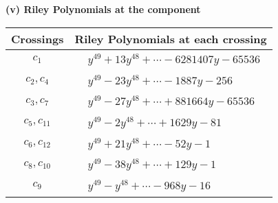 \documentclass[1p]{elsarticle_modified}
\theoremstyle{definition}
\begin{document}
\flushleft \textbf{(v) Riley Polynomials at the component}\newline \\
\begin{tabular}{m{50pt}|m{274pt}}
Crossings & \hspace{64pt}Riley Polynomials at each crossing \\
\hline $$\begin{aligned}c_{1}\end{aligned}$$&$\begin{aligned}
&y^{49}+13 y^{48}+\cdots-6281407 y-65536
\end{aligned}$\\
\hline $$\begin{aligned}c_{2},c_{4}\end{aligned}$$&$\begin{aligned}
&y^{49}-23 y^{48}+\cdots-1887 y-256
\end{aligned}$\\
\hline $$\begin{aligned}c_{3},c_{7}\end{aligned}$$&$\begin{aligned}
&y^{49}-27 y^{48}+\cdots+881664 y-65536
\end{aligned}$\\
\hline $$\begin{aligned}c_{5},c_{11}\end{aligned}$$&$\begin{aligned}
&y^{49}-2 y^{48}+\cdots+1629 y-81
\end{aligned}$\\
\hline $$\begin{aligned}c_{6},c_{12}\end{aligned}$$&$\begin{aligned}
&y^{49}+21 y^{48}+\cdots-52 y-1
\end{aligned}$\\
\hline $$\begin{aligned}c_{8},c_{10}\end{aligned}$$&$\begin{aligned}
&y^{49}-38 y^{48}+\cdots+129 y-1
\end{aligned}$\\
\hline $$\begin{aligned}c_{9}\end{aligned}$$&$\begin{aligned}
&y^{49}- y^{48}+\cdots-968 y-16
\end{aligned}$\\
\hline
\end{tabular}\\~\\
\end{document}
